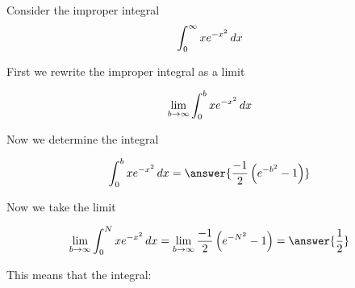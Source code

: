 \documentclass{ximera}
\author{Jason Miller}
\begin{document}
\begin{exercise}
Consider the improper integral 
\[
\int_{0}^{\infty} xe^{-x^{2}} \mathop{}\!d x 
\]


First we rewrite the improper integral as a limit

\[
\lim_{b\to \infty} \int_{0}^{b} xe^{-x^{2}} \mathop{}\!d x
\]

Now we determine the integral 

\[
\int_{0}^{b} xe^{-x^{2}} \d x= \answer{ \frac{-1}{2}\left(e^{-b^{2}}-1 \right) }
\]

\begin{exercise}
Now we take the limit 

\[
\lim_{b \to \infty} \int_{0}^{N} xe^{-x^{2}} \d x=\lim_{b \to \infty} \frac{-1}{2} \left( e^{-N^{2}}-1 \right) = 
\answer{ \frac{1}{2}} 
\]

\begin{exercise}
This means that the integral: 

\begin{multipleChoice}
\end{multipleChoice}

\end{exercise}
\end{exercise}
\end{exercise}
\end{document}
